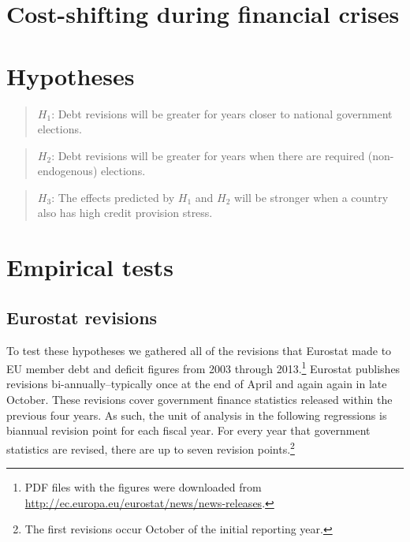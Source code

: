 \documentclass[]{article}
\begin{document}
\cite{DeCastro2013} \cite{Alt2014}

\section{Cost-shifting during financial crises}

\cite{GandrudHallerberg2016}

\section{Hypotheses}

\begin{quote}
    $H_{1}$: Debt revisions will be greater for years closer to national government elections.
\end{quote}

\begin{quote}
    $H_{2}$: Debt revisions will be greater for years when there are required (non-endogenous) elections.
\end{quote}

\begin{quote}
    $H_{3}$: The effects predicted by $H_{1}$ and $H_{2}$ will be stronger when a country also has high credit provision stress.
\end{quote}

\section{Empirical tests}

\subsection{Eurostat revisions}

To test these hypotheses we gathered all of the revisions that Eurostat made to EU member debt and deficit figures from 2003 through 2013.\footnote{PDF files with the figures were downloaded from \url{http://ec.europa.eu/eurostat/news/news-releases}.} Eurostat publishes revisions bi-annually--typically once at the end of April and again again in late October. These revisions cover government finance statistics released within the previous four years. As such, the unit of analysis in the following regressions is biannual revision point for each fiscal year. For every year that government statistics are revised, there are up to seven revision points.\footnote{The first revisions occur October of the initial reporting year.}
\end{document}
